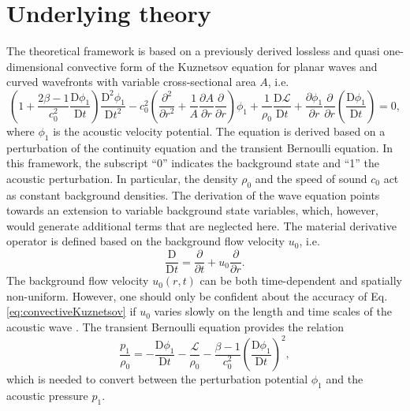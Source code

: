 \section{Underlying theory}
\label{sec:Underlying theory}

The theoretical framework is based on a previously derived lossless and quasi one-dimensional convective form of the Kuznetsov equation for planar waves and curved wavefronts with variable cross-sectional area $A$, i.e.
\begin{equation}
\left(1 + \dfrac{2\beta - 1}{c_0^2}\dfrac{\mathrm{D}\phi_1}{\mathrm{D}t}\right)\dfrac{\mathrm{D}^2\phi_1}{\mathrm{D}t^2} 
- c_0^2\left(\dfrac{\partial^2}{\partial r^2} + \dfrac{1}{A}\dfrac{\partial A}{\partial
r}\dfrac{\partial}{\partial r}\right)\phi_1
+ \dfrac{1}{\rho_0}\dfrac{\mathrm{D}\mathcal{L}}{\mathrm{D}t}
+ \dfrac{\partial \phi_1}{\partial r}\dfrac{\partial}{\partial r}\left(\dfrac{\mathrm{D}\phi_1}{\mathrm{D}t}\right) = 0,
\label{eq:convectiveKuznetsov}
\end{equation}
where $\phi_1$ is the acoustic velocity potential. The equation is derived based on a perturbation of the continuity equation and the transient Bernoulli equation. In this framework, the subscript ``0'' indicates the background state and ``1'' the acoustic perturbation. In particular, the density $\rho_0$ and the speed of sound $c_0$ act as constant background densities. The derivation of the wave equation points towards an extension to variable background state variables, which, however, would generate additional terms that are neglected here. The material derivative operator is defined based on the background flow velocity $u_0$, i.e.
\begin{equation}
\dfrac{\mathrm{D}}{\mathrm{D}t} = \dfrac{\partial}{\partial t} + u_0 \dfrac{\partial}{\partial r}.
\label{eq:MaterialDerivative}
\end{equation}
The background flow velocity $u_0\left(r,t\right)$ can be both time-dependent and spatially non-uniform. However, one should only be confident about the accuracy of Eq. \eqref{eq:convectiveKuznetsov} if $u_0$ varies slowly on the length and time scales of the acoustic wave \citep{Pierce_1990}. The transient Bernoulli equation provides the relation
\begin{equation}
\dfrac{p_1}{\rho_0} = - \dfrac{\mathrm{D}\phi_1}{\mathrm{D}t} - \dfrac{\mathcal{L}}{\rho_0} - \dfrac{\beta - 1}{c_0^2}\left(\dfrac{\mathrm{D}\phi_1}{\mathrm{D}t}\right)^2,
\label{eq:p1pi1}
\end{equation}
which is needed to convert between the perturbation potential $\phi_1$ and the acoustic pressure $p_1$.

